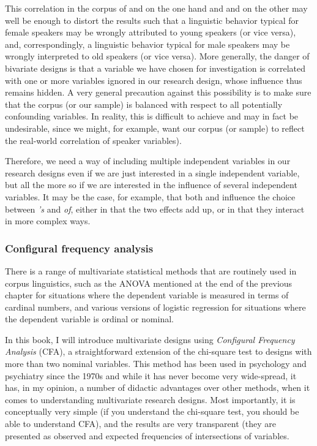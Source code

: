 This correlation in the corpus of  and  on the one hand and  and  on the other may well be enough to distort the results such that a linguistic behavior typical for female speakers may be wrongly attributed to young speakers (or vice versa), and, correspondingly, a linguistic behavior typical for male speakers may be wrongly interpreted to old speakers (or vice versa). More generally, the danger of bivariate designs is that a variable we have chosen for investigation is correlated with one or more variables ignored in our research design, whose influence thus remains hidden. A very general precaution against this possibility is to make sure that the corpus (or our sample) is balanced with respect to all potentially confounding variables. In reality, this is difficult to achieve and may in fact be undesirable, since we might, for example, want our corpus (or sample) to reflect the real-world correlation of speaker variables).

Therefore, we need a way of including multiple independent variables in our research designs even if we are just interested in a single independent variable, but all the more so if we are interested in the influence of several independent variables. It may be the case, for example, that both  and  influence the choice between \textit{'s} and \textit{of}, either in that the two effects add up, or in that they interact in more complex ways.

\subsubsection{Configural frequency analysis}

There is a range of multivariate statistical methods that are routinely used in corpus linguistics, such as the ANOVA mentioned at the end of the previous chapter for situations where the dependent variable is measured in terms of cardinal numbers, and various versions of logistic regression for situations where the dependent variable is ordinal or nominal.

In this book, I will introduce multivariate designs using \textit{Configural Frequency Analysis} (CFA), a straightforward extension of the chi-square test to designs with more than two nominal variables. This method has been used in psychology and psychiatry since the 1970s and while it has never become very wide-spread, it has, in my opinion, a number of didactic advantages over other methods, when it comes to understanding multivariate research designs. Most importantly, it is conceptually very simple (if you understand the chi-square test, you should be able to understand CFA), and the results are very transparent (they are presented as observed and expected frequencies of intersections of variables.

